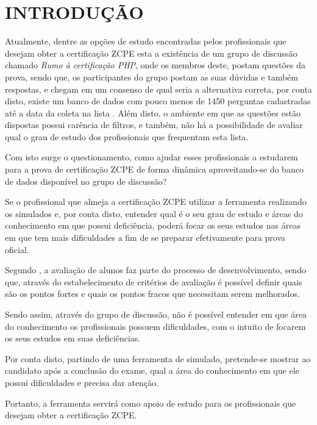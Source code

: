 \chapter{INTRODUÇÃO}
\label{chp:intro}

Atualmente, dentre as opções de estudo encontradas pelos
profissionais que desejam obter a certificação \ac{ZCPE} esta a existência de um
grupo de discussão chamado \textit{Rumo à certificação PHP}, onde os membros
deste, postam questões da prova, sendo que, os participantes do grupo postam as
suas dúvidas e também respostas, e chegam em um consenso de qual seria a
alternativa correta, por conta disto, existe um banco de dados com pouco menos
de 1450 perguntas cadastradas até a data da coleta na lista
\cite{googleGroupsRumoACertificaoPHP}. Além disto, o ambiente em que as
questões estão dispostas possui carência de filtros, e também, não há a
possibilidade de avaliar qual o grau de estudo dos profissionais que frequentam
esta lista.

Com isto surge o questionamento, como ajudar esses profissionais a estudarem
para a prova de certificação \acs{ZCPE} de forma dinâmica aproveitando-se do 
banco de dados disponível no grupo de discussão?


Se o profissional que almeja a certificação \acs{ZCPE} utilizar a ferramenta
realizando os simulados e, por conta disto, entender qual é o seu grau de estudo e áreas
do conhecimento em que possui deficiência, poderá focar os seus estudos
nas áreas em que tem mais dificuldades a fim de se preparar efetivamente para
prova oficial.


Segundo , a avaliação de
alunos faz parte do processo de desenvolvimento, sendo que, através do estabelecimento
de critérios de avaliação é possível definir quais são os pontos fortes e quais
os pontos fracos que necessitam serem melhorados.

Sendo assim, através do grupo de discussão, não é possível entender em
que área do conhecimento os profissionais possuem dificuldades, com o intuito de
focarem os seus estudos em suas deficiências.

Por conta disto, partindo de uma ferramenta de simulado, pretende-se mostrar ao
candidato após a conclusão do exame, qual a área do conhecimento em que ele
possuí dificuldades e precisa dar atenção.

Portanto, a ferramenta servirá como apoio de
estudo para os profissionais que desejam obter a certificação \acs{ZCPE}.

